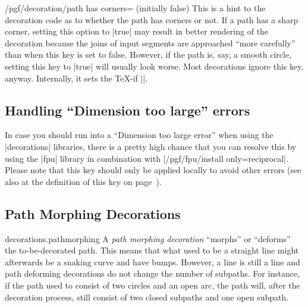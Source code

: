 \begin{key}{/pgf/decoration/path has corners= (initially false)}
    This is a hint to the decoration code as to whether the path has corners or
    not. If a path has a sharp corner, setting this option to |true| may result
    in better rendering of the decoration because the joins of input segments
    are approached ``more carefully'' than when this key is set to false.
    However, if the path is, say, a smooth circle, setting this key to |true|
    will usually look worse. Most decorations ignore this key, anyway.
    Internally, it sets the \TeX-if |\ifpgfdecoratepathhascorners|.
\end{key}


\subsection{Handling ``Dimension too large'' errors}

In case you should run into a ``Dimension too large error'' when using the
|decorations| libraries, there is a pretty high chance that you can resolve
this by using the |fpu| library in combination with
|/pgf/fpu/install only={reciprocal}|. Please note that this key should only be
applied locally to avoid other errors (see also at the definition of this key
on page~\pageref{fpu-install-only}).
%
\begin{codeexample}[preamble={\usetikzlibrary{decorations.markings,fpu}}]
\end{codeexample}


\subsection{Path Morphing Decorations}

\begin{pgflibrary}{decorations.pathmorphing}
    A \emph{path morphing decoration} ``morphs'' or ``deforms'' the
    to-be-decorated path. This means that what used to be a straight line might
    afterwards be a snaking curve and have bumps. However, a line is still a
    line and path deforming decorations do not change the number of subpaths.
    For instance, if the path used to consist of two circles and an open arc,
    the path will, after the decoration process, still consist of two closed
    subpaths and one open subpath.
\end{pgflibrary}


